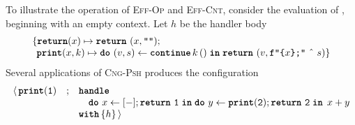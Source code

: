 To illustrate the operation of \textsc{Eff-Op} and \textsc{Eff-Cnt}, consider the evaluation of , beginning with an empty context. Let $h$ be the handler body 
\[\begin{array}{l}\{ \textbf{\texttt{return}}(x) \mapsto {\texttt{\textbf{return}} \,\, {(x, \texttt{""})}}; \\
\; \, \textbf{\texttt{print}}(x, k) \mapsto {\texttt{\textbf{do}} \,\, {(v, s)} \leftarrow {\textbf{\texttt{continue}} \, {k} \, {()}} \; \textbf{\texttt{in}} \; {\texttt{\textbf{return}} \,\, {(v, \texttt{f"\{$x$\};"} \text{ \^\ } s)}}}\}\end{array}\]
Several applications of \textsc{Cng-Psh} produces the configuration
{  \arraycolsep=3pt
\small
\[\begin{array}{rcl}
  \langle \, \texttt{\textbf{print}}(\texttt{1}) &;& \textbf{\texttt{handle}}\\
                        && \quad \texttt{\textbf{do}} \,\, {x} \leftarrow {[-];\texttt{\textbf{return}} \,\, {\texttt{1}}} \; \textbf{\texttt{in}} \; {{\texttt{\textbf{do}} \,\, {y} \leftarrow {\texttt{\textbf{print}}(\texttt{2});\texttt{\textbf{return}} \,\, {\texttt{2}}} \; \textbf{\texttt{in}} \; {\, x + y}}} \\
                        && \textbf{\texttt{with}} \, \{ h \}\, \rangle
\end{array}
  \]
}

